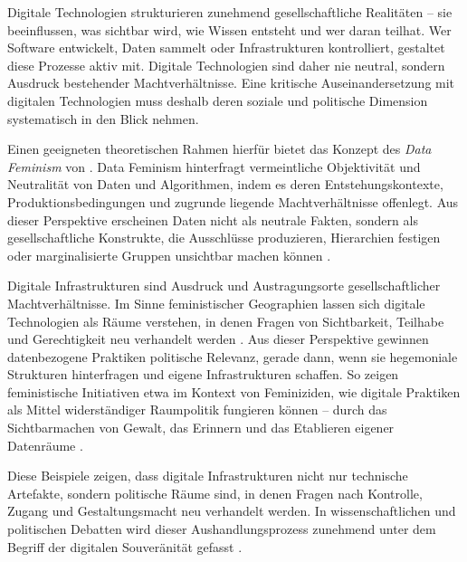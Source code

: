Digitale Technologien strukturieren zunehmend gesellschaftliche Realitäten -- sie beeinflussen, was sichtbar wird, wie Wissen entsteht und wer daran teilhat. Wer Software entwickelt, Daten sammelt oder Infrastrukturen kontrolliert, gestaltet diese Prozesse aktiv mit. Digitale Technologien sind daher nie neutral, sondern Ausdruck bestehender Machtverhältnisse. Eine kritische Auseinandersetzung mit digitalen Technologien muss deshalb deren soziale und politische Dimension systematisch in den Blick nehmen.

Einen geeigneten theoretischen Rahmen hierfür bietet das Konzept des \textit{Data Feminism} von \textcite{dignazioDataFeminism2020}. Data Feminism hinterfragt vermeintliche Objektivität und Neutralität von Daten und Algorithmen, indem es deren Entstehungskontexte, Produktionsbedingungen und zugrunde liegende Machtverhältnisse offenlegt. Aus dieser Perspektive erscheinen Daten nicht als neutrale Fakten, sondern als gesellschaftliche Konstrukte, die Ausschlüsse produzieren, Hierarchien festigen oder marginalisierte Gruppen unsichtbar machen können \parencite{elwoodFeministDigitalGeographies2018}.

Digitale Infrastrukturen sind Ausdruck und Austragungsorte gesellschaftlicher Machtverhältnisse. Im Sinne feministischer Geographien lassen sich digitale Technologien als Räume verstehen, in denen Fragen von Sichtbarkeit, Teilhabe und Gerechtigkeit neu verhandelt werden \parencite{elwoodFeministDigitalGeographies2018}. Aus dieser Perspektive gewinnen datenbezogene Praktiken politische Relevanz, gerade dann, wenn sie hegemoniale Strukturen hinterfragen und eigene Infrastrukturen schaffen. So zeigen feministische Initiativen etwa im Kontext von Feminiziden, wie digitale Praktiken als Mittel widerständiger Raumpolitik fungieren können -- durch das Sichtbarmachen von Gewalt, das Erinnern und das Etablieren eigener Datenräume \parencite{dignazioGeographiesMissingData2024}.

Diese Beispiele zeigen, dass digitale Infrastrukturen nicht nur technische Artefakte, sondern politische Räume sind, in denen Fragen nach Kontrolle, Zugang und Gestaltungsmacht neu verhandelt werden. In wissenschaftlichen und politischen Debatten wird dieser Aushandlungsprozess zunehmend unter dem Begriff der digitalen Souveränität gefasst \parencite{glaszeContestedSpatialitiesDigital2023}.

